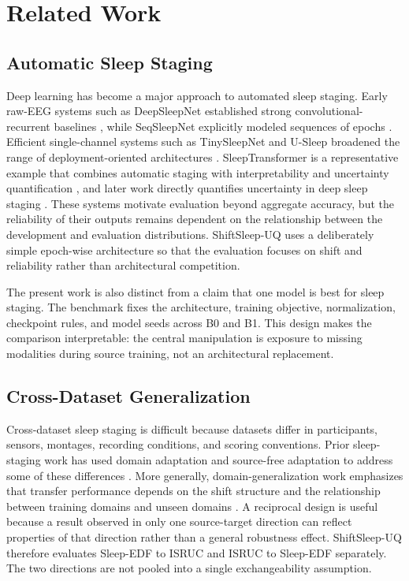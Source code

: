\documentclass[11pt]{article}
\begin{document}
\section{Related Work}
\subsection{Automatic Sleep Staging}
Deep learning has become a major approach to automated sleep staging. Early raw-EEG systems such as DeepSleepNet established strong convolutional-recurrent baselines \citep{supratak2017deepsleepnet}, while SeqSleepNet explicitly modeled sequences of epochs \citep{phan2019seqsleepnet}. Efficient single-channel systems such as TinySleepNet and U-Sleep broadened the range of deployment-oriented architectures \citep{supratak2020tinysleepnet,perslev2021usleep}. SleepTransformer is a representative example that combines automatic staging with interpretability and uncertainty quantification \citep{phan2022sleeptransformer}, and later work directly quantifies uncertainty in deep sleep staging \citep{vainikka2026directuq}. These systems motivate evaluation beyond aggregate accuracy, but the reliability of their outputs remains dependent on the relationship between the development and evaluation distributions. ShiftSleep-UQ uses a deliberately simple epoch-wise architecture so that the evaluation focuses on shift and reliability rather than architectural competition.

The present work is also distinct from a claim that one model is best for sleep staging. The benchmark fixes the architecture, training objective, normalization, checkpoint rules, and model seeds across B0 and B1. This design makes the comparison interpretable: the central manipulation is exposure to missing modalities during source training, not an architectural replacement.

\subsection{Cross-Dataset Generalization}
Cross-dataset sleep staging is difficult because datasets differ in participants, sensors, montages, recording conditions, and scoring conventions. Prior sleep-staging work has used domain adaptation and source-free adaptation to address some of these differences \citep{zhao2021unsupervisedsleepdomain,zhou2025sourcefree,zhu2023multisource}. More generally, domain-generalization work emphasizes that transfer performance depends on the shift structure and the relationship between training domains and unseen domains \citep{zhou2022dgsurvey}. A reciprocal design is useful because a result observed in only one source-target direction can reflect properties of that direction rather than a general robustness effect. ShiftSleep-UQ therefore evaluates Sleep-EDF to ISRUC and ISRUC to Sleep-EDF separately. The two directions are not pooled into a single exchangeability assumption.
\end{document}
